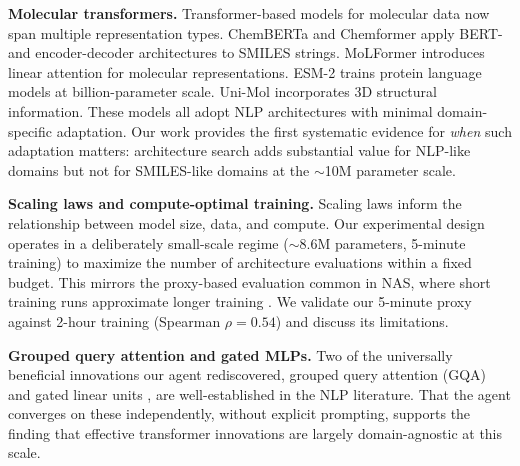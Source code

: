 \textbf{Molecular transformers.}
Transformer-based models for molecular data now span multiple representation types. ChemBERTa \citep{chithrananda2020chemberta} and Chemformer \citep{irwin2022chemformer} apply BERT- and encoder-decoder architectures to SMILES strings. MoLFormer \citep{ross2022molformer} introduces linear attention for molecular representations. ESM-2 \citep{lin2023esm2} trains protein language models at billion-parameter scale. Uni-Mol \citep{zhou2023unimol} incorporates 3D structural information. These models all adopt NLP architectures with minimal domain-specific adaptation. Our work provides the first systematic evidence for \emph{when} such adaptation matters: architecture search adds substantial value for NLP-like domains but not for SMILES-like domains at the ${\sim}$10M parameter scale.

\textbf{Scaling laws and compute-optimal training.}
Scaling laws \citep{kaplan2020scaling,hoffmann2022chinchilla} inform the relationship between model size, data, and compute. Our experimental design operates in a deliberately small-scale regime (${\sim}$8.6M parameters, 5-minute training) to maximize the number of architecture evaluations within a fixed budget. This mirrors the proxy-based evaluation common in NAS, where short training runs approximate longer training \citep{elsken2019nas}. We validate our 5-minute proxy against 2-hour training (Spearman $\rho = 0.54$) and discuss its limitations.

\textbf{Grouped query attention and gated MLPs.}
Two of the universally beneficial innovations our agent rediscovered, grouped query attention (GQA) \citep{ainslie2023gqa,touvron2023llama2} and gated linear units \citep{dauphin2017glu,shazeer2020glu}, are well-established in the NLP literature. That the agent converges on these independently, without explicit prompting, supports the finding that effective transformer innovations are largely domain-agnostic at this scale.
